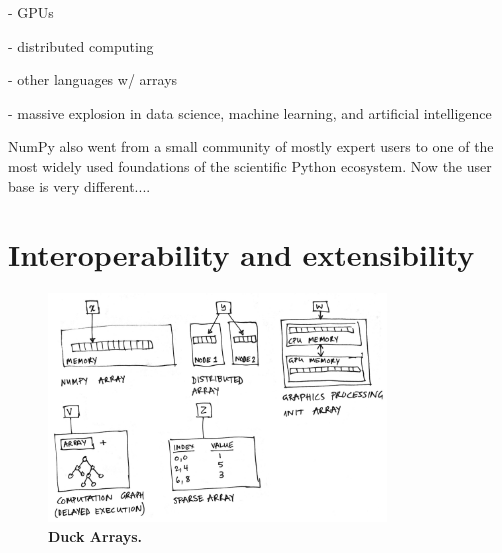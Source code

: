 - GPUs

- distributed computing

- other languages w/ arrays

- massive explosion in data science, machine learning, and artificial intelligence

NumPy also went from a small community of mostly expert users to
one of the most widely used foundations of the scientific Python
ecosystem.
Now the user base is very different....

\section*{Interoperability and extensibility}

\begin{figure}
  \centering
  \includegraphics[width=0.8\textwidth]{static/sketches/duck-arrays}
  \caption{\textbf{Duck Arrays.} }
  \label{fig:duck-arrays}
\end{figure}



